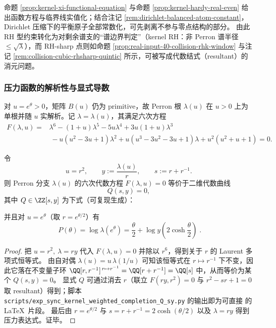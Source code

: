\begin{remark}\label{rem:rh-core-elimination}
命题 \ref{prop:kernel-xi-functional-equation} 与命题 \ref{prop:kernel-hardy-real-even} 给出函数方程与临界线实值化；结合注记 \ref{rem:dirichlet-balanced-atom-constant}，Dirichlet 压缩下的平衡原子全部常数化，可先剥离不参与零点结构的部分。
由此 RH 型约束转化为对剩余谱支的“谱边界判定”（kernel RH：非 Perron 谱半径 \(\le \sqrt{\lambda}\)），而 RH-sharp 点则如命题 \ref{prop:real-input-40-collision-rhk-window} 与注记 \ref{rem:collision-cubic-rhsharp-quintic} 所示，可被写成代数结式（resultant）的消元问题。
\end{remark}

\subsubsection{压力函数的解析性与显式导数}\label{app:pressure-analytic}
对 $u=e^\theta>0$，矩阵 $B(u)$ 仍为 primitive，故 Perron 根 $\lambda(u)$ 在 $u>0$ 上为单根并随 $u$ 实解析。记 $\lambda=\lambda(u)$，其满足六次方程
\[
\begin{aligned}
F(\lambda,u)
={}&\lambda^6-(1+u)\lambda^5-5u\lambda^4+3u(1+u)\lambda^3\\
&\ -u(u^2-3u+1)\lambda^2+u(u^3-3u^2-3u+1)\lambda+u^2(u^2+u+1)=0.
\end{aligned}
\]
\begin{proposition}[完成化回文降维：\texorpdfstring{$F(\lambda,u)=0$}{F=0} 等价于 \texorpdfstring{$Q(s,y)=0$}{Q=0}]\label{prop:weighted-completion-Q}
令
$$
u=r^2,\qquad y:=\frac{\lambda(u)}{r},\qquad s:=r+r^{-1}.
$$
则 Perron 分支 \(\lambda(u)\) 的六次代数方程 \(F(\lambda,u)=0\) 等价于二维代数曲线
\[
Q(s,y)=0,
\]
其中 \(Q\in\ZZ[s,y]\) 为下式（可复现生成）：

并且对 \(u=e^\theta\)（取 \(r=e^{\theta/2}\)）有
\[
\boxed{\;
P(\theta)=\log\lambda(e^\theta)=\frac{\theta}{2}+\log y\!\left(2\cosh\frac{\theta}{2}\right)\; }.
\]
\end{proposition}
\begin{proof}
把 \(u=r^2,\ \lambda=r y\) 代入 \(F(\lambda,u)=0\) 并除以 \(r^6\)，得到关于 \(r\) 的 Laurent 多项式恒等式。
由自对偶 \(\lambda(u)=u\,\lambda(1/u)\) 可知该恒等式在 \(r\mapsto r^{-1}\) 下不变，因此它落在不变量子环
\(
\QQ[r,r^{-1}]^{\,r\mapsto r^{-1}}=\QQ[r+r^{-1}]=\QQ[s]
\)
中，从而等价为某个 \(Q(s,y)=0\)。
显式 \(Q\) 可通过消去 \(r\)（联立 \(F(r y,r^2)=0\) 与 \(r^2-sr+1=0\) 取 resultant）得到；脚本 \texttt{scripts/exp\_sync\_kernel\_weighted\_completion\_Q\_sy.py} 的输出即为可直接 \verb|| 的 \LaTeX\ 片段。
最后由 \(r=e^{\theta/2}\) 与 \(s=r+r^{-1}=2\cosh(\theta/2)\) 以及 \(\lambda=r y\) 得到压力表达式。证毕。
\end{proof}


